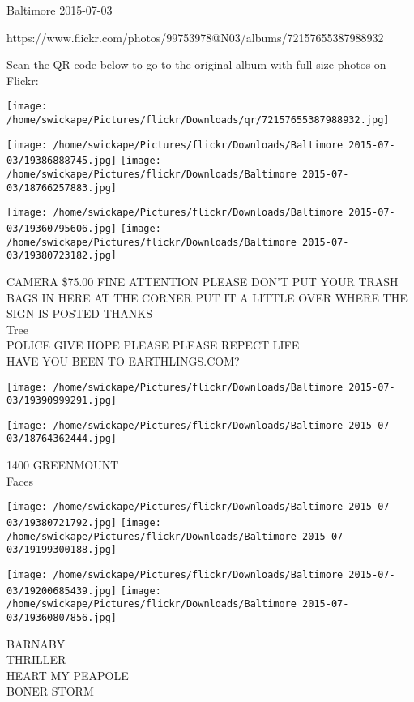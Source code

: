 \documentclass[10pt,letterpaper]{article}
\begin{document}
Baltimore 2015-07-03

https://www.flickr.com/photos/99753978@N03/albums/72157655387988932

Scan the QR code below to go to the original album with full-size photos on Flickr:

\texttt{[image: /home/swickape/Pictures/flickr/Downloads/qr/72157655387988932.jpg]}
\pagebreak

\texttt{[image: /home/swickape/Pictures/flickr/Downloads/Baltimore 2015-07-03/19386888745.jpg]}
\texttt{[image: /home/swickape/Pictures/flickr/Downloads/Baltimore 2015-07-03/18766257883.jpg]}

\texttt{[image: /home/swickape/Pictures/flickr/Downloads/Baltimore 2015-07-03/19360795606.jpg]}
\texttt{[image: /home/swickape/Pictures/flickr/Downloads/Baltimore 2015-07-03/19380723182.jpg]}

CAMERA \$75.00 FINE ATTENTION PLEASE DON'T PUT YOUR TRASH BAGS IN HERE AT THE CORNER PUT IT A LITTLE OVER WHERE THE SIGN IS POSTED THANKS\\
Tree\\
POLICE GIVE HOPE PLEASE PLEASE REPECT LIFE\\
HAVE YOU BEEN TO EARTHLINGS.COM?\\
\pagebreak

\texttt{[image: /home/swickape/Pictures/flickr/Downloads/Baltimore 2015-07-03/19390999291.jpg]}

\vspace{0.25in}
\texttt{[image: /home/swickape/Pictures/flickr/Downloads/Baltimore 2015-07-03/18764362444.jpg]}

1400 GREENMOUNT\\
Faces\\
\pagebreak

\texttt{[image: /home/swickape/Pictures/flickr/Downloads/Baltimore 2015-07-03/19380721792.jpg]}
\texttt{[image: /home/swickape/Pictures/flickr/Downloads/Baltimore 2015-07-03/19199300188.jpg]}

\texttt{[image: /home/swickape/Pictures/flickr/Downloads/Baltimore 2015-07-03/19200685439.jpg]}
\texttt{[image: /home/swickape/Pictures/flickr/Downloads/Baltimore 2015-07-03/19360807856.jpg]}

BARNABY\\
THRILLER\\
HEART MY PEAPOLE\\
BONER STORM\\
\pagebreak
\end{document}
